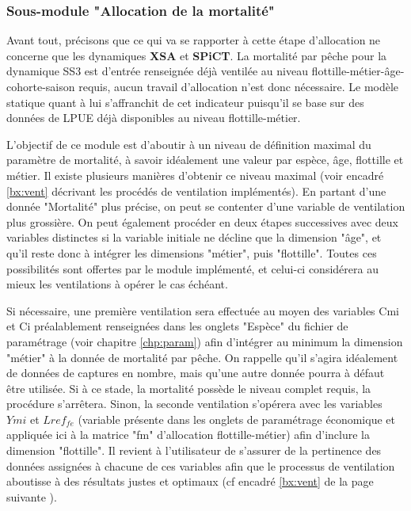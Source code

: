 \documentclass[12pt, colorinlistoftodos, notitlepage]{report}
\newenvironment{not used}[1]{%
    \longtable{%
        |>{\centering$\displaystyle}A{#1}{1}<{$}%
        |}\hline\ignorespaces}{%
    \endlongtable\ignorespacesafterend}
\begin{document}
\subsubsection{Sous-module "Allocation de la mortalité"}

Avant tout, précisons que ce qui va se rapporter à cette étape d'allocation ne concerne que les dynamiques \textbf{XSA} et \textbf{SPiCT}. La mortalité par pêche pour la dynamique SS3 est d'entrée renseignée déjà ventilée au niveau flottille-métier-âge-cohorte-saison requis, aucun travail d'allocation n'est donc nécessaire. Le modèle statique quant à lui s'affranchit de cet indicateur puisqu'il se base sur des données de LPUE déjà disponibles au niveau flottille-métier. 

L’objectif de ce module est d’aboutir à un niveau de définition maximal du paramètre de mortalité, à savoir idéalement une valeur par espèce, âge, flottille et métier. Il existe plusieurs manières d’obtenir ce niveau maximal (voir encadré \ref{bx:vent} décrivant les procédés de ventilation implémentés). En partant d’une donnée "Mortalité" plus précise, on peut se contenter d’une variable de ventilation plus grossière. On peut également procéder en deux étapes successives avec deux variables distinctes si la variable initiale ne décline que la dimension "âge", et qu'il reste donc à intégrer les dimensions "métier", puis "flottille". Toutes ces possibilités sont offertes par le module implémenté, et celui-ci considérera au mieux les ventilations à opérer le cas échéant.

Si nécessaire, une première ventilation sera effectuée au moyen des variables Cmi et Ci préalablement renseignées dans les onglets "Espèce" du fichier de paramétrage (voir chapitre \ref{chp:param}) afin d'intégrer au minimum la dimension "métier" à la donnée de mortalité par pêche. On rappelle qu'il s'agira idéalement de données de captures en nombre, mais qu'une autre donnée pourra à défaut être utilisée. Si à ce stade, la mortalité possède le niveau complet requis, la procédure s'arrêtera. Sinon, la seconde ventilation s’opérera avec les variables $Ymi$ et $Lref_{fe}$ (variable présente dans les onglets de paramétrage économique et appliquée ici à la matrice "fm" d'allocation flottille-métier) afin d'inclure la dimension "flottille". Il revient à l'utilisateur de s'assurer de la pertinence des données assignées à chacune de ces variables afin que le processus de ventilation aboutisse à des résultats justes et optimaux (cf encadré \ref{bx:vent} de la page suivante ).
\end{document}
